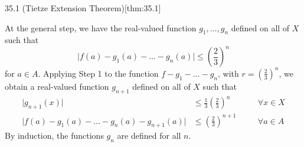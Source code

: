 \begin{thmBox}{35.1 (Tietze Extension Theorem)}[thm:35.1]
\begin{proofBox}
    At the general step, we have the real-valued function 
    \( g_{ 1 } , \ldots , g_{ n } \) defined on all of \( X \) such that 
    \begin{equation*}
        \lvert f ( a ) - g_{ 1 } ( a ) - \ldots - g_{ n } ( a ) \rvert
        \leq 
        \left( \frac{ 2 }{ 3 } \right)^{ n }
    \end{equation*}
    for \( a \in A \). 
    Applying Step 1 to the function \( f - g_{ 1 } - \ldots - g_{ n } \), with 
    \( r = ( \frac{ 2 }{ 3 } )^{ n } \), we obtain a real-valued function 
    \( g_{ n + 1 } \) defined on all of \( X \) such that 
    \begin{equation*}
        \begin{alignedat}{2}
            \lvert g_{ n + 1 } ( x ) \rvert &\leq 
            \frac{ 1 }{ 3 } \left( \frac{ 2 }{ 3 } \right)^{ n }
            &&\quad \forall x \in X
            \\
            \lvert f ( a ) - g_{ 1 } ( a ) - \ldots - g_{ n } ( a ) 
            - g_{ n + 1 } ( a ) \rvert 
            &\leq 
            \left( \frac{ 2 }{ 3 } \right)^{ n + 1 }
            &&\quad \forall a \in A 
        \end{alignedat}
    \end{equation*}
    By induction, the functions \( g_{ n } \) are defined for all \( n \). 

    \baseSkip 


\end{proofBox}
\end{thmBox}
